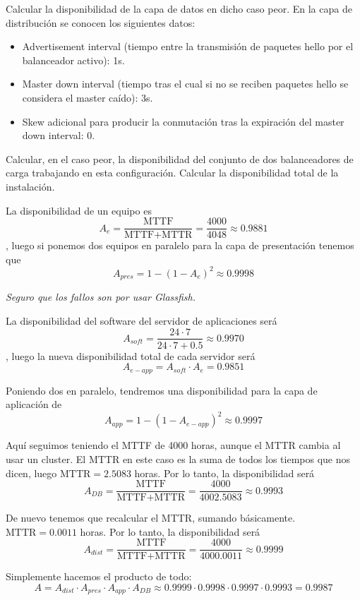 \begin{problem}[11]
Calcular la disponibilidad de la capa de datos en dicho caso peor.
\ppart En la capa de distribución se conocen los siguientes datos:
\begin{itemize}
	\item Advertisement interval (tiempo entre la transmisión de paquetes hello por el balanceador activo): 1s.
	\item Master down interval (tiempo tras el cual si no se reciben paquetes hello se considera el master caído): 3s.
	\item Skew adicional para producir la conmutación tras la expiración del master down interval: 0.
\end{itemize}

Calcular, en el caso peor, la disponibilidad del conjunto de dos balanceadores de carga trabajando en esta configuración.
\ppart Calcular la disponibilidad total de la instalación.

\solution


\spart

La disponibilidad de un equipo es \[ A_e = \frac{\text{MTTF}}{\text{MTTF} + \text{MTTR}} = \frac{4000}{4048} \approx 0.9881 \], luego si ponemos dos equipos en paralelo para la capa de presentación tenemos que \[ A_{pres} = 1 - (1 - A_e)^2 \approx 0.9998 \]

\spart

\textit{Seguro que los fallos son por usar Glassfish.}

La disponibilidad del software del servidor de aplicaciones será \[ A_{soft} = \frac{24 · 7}{24 · 7 + 0.5} \approx 0.9970\], luego la nueva disponibilidad total de cada servidor será \[ A_{e-app} = A_{soft} · A_e = 0.9851 \]

Poniendo dos en paralelo, tendremos una disponibilidad para la capa de aplicación de \[ A_{app} = 1 - (1 - A_{e-app})^2 \approx 0.9997 \]

\spart

Aquí seguimos teniendo el MTTF de 4000 horas, aunque el MTTR cambia al usar un cluster. El MTTR en este caso es la suma de todos los tiempos que nos dicen, luego $\text{MTTR} = 2.5083$ horas. Por lo tanto, la disponibilidad será \[ A_{DB} = \frac{\text{MTTF}}{\text{MTTF} + \text{MTTR}} = \frac{4000}{4002.5083} \approx 0.9993 \]

\spart

De nuevo tenemos que recalcular el MTTR, sumando básicamente. $\text{MTTR} = 0.0011$ horas. Por lo tanto, la disponibilidad será \[ A_{dist} = \frac{\text{MTTF}}{\text{MTTF} + \text{MTTR}} = \frac{4000}{4000.0011} \approx 0.9999 \]

\spart

Simplemente hacemos el producto de todo: \[ A = A_{dist} · A_{pres} · A_{app} · A_{DB} \approx 0.9999 · 0.9998 · 0.9997 · 0.9993 = 0.9987\]

\end{problem}

